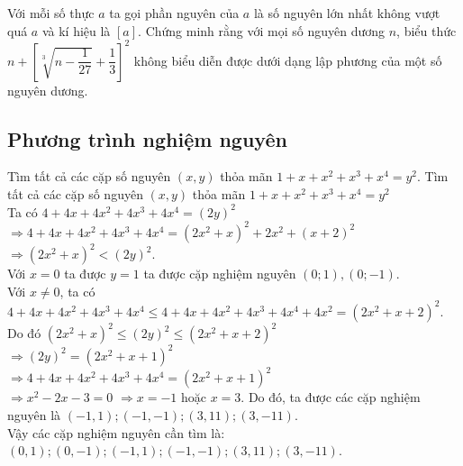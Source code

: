 \begin{bt}
	Với mỗi số thực $a$ ta gọi phần nguyên của $a$ là số nguyên lớn nhất không vượt quá $a$ và kí hiệu là $[a]$. Chứng minh rằng với mọi số nguyên dương $n$, biểu thức $n+\left[\sqrt[3]{n-\dfrac{1}{27}}+\dfrac{1}{3}\right]^2$ không biểu diễn được dưới dạng lập phương của một số nguyên dương.
\end{bt}
\subsection{Phương trình nghiệm nguyên}
\begin{bt}%
	Tìm tất cả các cặp số nguyên $(x,y)$ thỏa mãn $1+x+x^2+x^3+x^4=y^2$.
	\loigiai
	{
		Tìm tất cả các cặp số nguyên $(x,y)$ thỏa mãn $1+x+x^2+x^3+x^4=y^2$\\
		Ta có $4+4x+4x^2+4x^3+4x^4=(2y)^2$
		$\Rightarrow 4+4x+4x^2+4x^3+4x^4=(2x^2+x)^2+2x^2+(x+2)^2$ \\
		$\Rightarrow (2x^2+x)^2<(2y)^2$.\\
		Với $x=0$ ta được $y=1$ ta được cặp nghiệm nguyên $(0;1), (0;-1)$.\\
		Với $x \ne 0$, ta có $4+4x+4x^2+4x^3+4x^4 \leq 4+4x+4x^2+4x^3+4x^4 +4x^2=(2x^2+x+2)^2$.\\
		Do đó $(2x^2+x)^2 \leq (2y)^2 \leq (2x^2+x+2)^2$\\
		$\Rightarrow (2y)^2=(2x^2+x+1)^2$\\
		$\Rightarrow 4+4x+4x^2+4x^3+4x^4=(2x^2+x+1)^2$ \\
		$\Rightarrow x^2-2x-3=0$ $\Rightarrow x=-1$ hoặc $x=3$.
		Do đó, ta được các cặp nghiệm nguyên là $(-1,1); (-1,-1); (3,11); (3,-11)$.\\
		Vậy các cặp nghiệm nguyên cần tìm là: $(0,1); (0,-1); (-1,1); (-1,-1); (3,11); (3,-11)$.  
	}
\end{bt}

